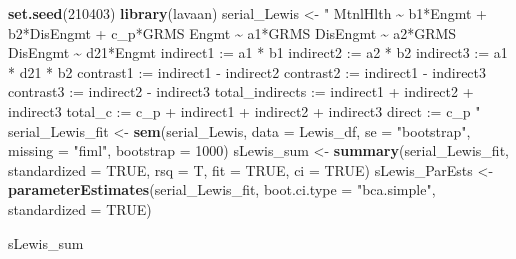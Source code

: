 \documentclass[
  11pt,
]{book}
\newenvironment{Shaded}{\begin{snugshade}}{\end{snugshade}}
\newcommand{\AttributeTok}[1]{\textcolor[rgb]{0.27,0.27,0.27}{#1}}
\newcommand{\ConstantTok}[1]{\textcolor[rgb]{0.37,0.37,0.37}{#1}}
\newcommand{\DecValTok}[1]{\textcolor[rgb]{0.06,0.06,0.06}{#1}}
\newcommand{\FunctionTok}[1]{\textcolor[rgb]{0.27,0.27,0.27}{\textbf{#1}}}
\newcommand{\NormalTok}[1]{#1}
\newcommand{\OtherTok}[1]{\textcolor[rgb]{0.37,0.37,0.37}{#1}}
\newcommand{\StringTok}[1]{\textcolor[rgb]{0.5,0.5,0.5}{#1}}
\begin{document}
\begin{Shaded}
\begin{Highlighting}[]
\FunctionTok{set.seed}\NormalTok{(}\DecValTok{210403}\NormalTok{)}
\FunctionTok{library}\NormalTok{(lavaan)}
\NormalTok{serial\_Lewis }\OtherTok{\textless{}{-}} \StringTok{"}
\StringTok{    MtnlHlth \textasciitilde{} b1*Engmt + b2*DisEngmt + c\_p*GRMS}
\StringTok{    Engmt \textasciitilde{} a1*GRMS    }
\StringTok{    DisEngmt \textasciitilde{} a2*GRMS}
\StringTok{    DisEngmt \textasciitilde{} d21*Engmt}
\StringTok{    indirect1 := a1 * b1}
\StringTok{    indirect2 := a2 * b2}
\StringTok{    indirect3 := a1 * d21 * b2}
\StringTok{    contrast1 := indirect1 {-} indirect2}
\StringTok{    contrast2 := indirect1 {-} indirect3}
\StringTok{    contrast3 := indirect2 {-} indirect3}
\StringTok{    total\_indirects := indirect1 + indirect2 + indirect3}
\StringTok{    total\_c := c\_p + indirect1 + indirect2 + indirect3}
\StringTok{    direct := c\_p}
\StringTok{"}
\NormalTok{serial\_Lewis\_fit }\OtherTok{\textless{}{-}} \FunctionTok{sem}\NormalTok{(serial\_Lewis, }\AttributeTok{data =}\NormalTok{ Lewis\_df, }\AttributeTok{se =} \StringTok{"bootstrap"}\NormalTok{,}
    \AttributeTok{missing =} \StringTok{"fiml"}\NormalTok{, }\AttributeTok{bootstrap =} \DecValTok{1000}\NormalTok{)}
\NormalTok{sLewis\_sum }\OtherTok{\textless{}{-}} \FunctionTok{summary}\NormalTok{(serial\_Lewis\_fit, }\AttributeTok{standardized =} \ConstantTok{TRUE}\NormalTok{, }\AttributeTok{rsq =}\NormalTok{ T, }\AttributeTok{fit =} \ConstantTok{TRUE}\NormalTok{,}
    \AttributeTok{ci =} \ConstantTok{TRUE}\NormalTok{)}
\NormalTok{sLewis\_ParEsts }\OtherTok{\textless{}{-}} \FunctionTok{parameterEstimates}\NormalTok{(serial\_Lewis\_fit, }\AttributeTok{boot.ci.type =} \StringTok{"bca.simple"}\NormalTok{,}
    \AttributeTok{standardized =} \ConstantTok{TRUE}\NormalTok{)}
\end{Highlighting}
\end{Shaded}

\begin{Shaded}
\begin{Highlighting}[]
\NormalTok{sLewis\_sum}
\end{Highlighting}
\end{Shaded}
\end{document}
